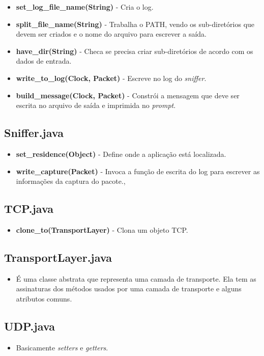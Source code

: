 \documentclass[11pt]{article}
\begin{document}
\begin{itemize}
	\item \textbf{set_log_file_name(String)} - Cria o log.
	\item \textbf{split_file_name(String)} - Trabalha o PATH, vendo os sub-diretórios que devem ser criados e o nome do arquivo para escrever a saída.
	\item \textbf{have_dir(String)} - Checa se precisa criar sub-diretórios de acordo com os dados de entrada.
	\item \textbf{write_to_log(Clock, Packet)} - Escreve no log do \textit{sniffer}.
	\item \textbf{build_message(Clock, Packet)} - Constrói a mensagem que deve ser escrita no arquivo de saída e imprimida no \textit{prompt}.
\end{itemize}

\subsection{Sniffer.java}

\begin{itemize}
	\item \textbf{set_residence(Object)} - Define onde a aplicação está localizada.
	\item \textbf{write_capture(Packet)} - Invoca a função de escrita do log para escrever as informações da captura do pacote.,
\end{itemize}

\subsection{TCP.java}

\begin{itemize}
	\item \textbf{clone_to(TransportLayer)} - Clona um objeto TCP.
\end{itemize}

\subsection{TransportLayer.java}

\begin{itemize}
	\item É uma classe abstrata que representa uma camada de transporte. Ela tem as assinaturas dos métodos usados por uma camada de transporte e alguns atributos comuns.
\end{itemize}

\subsection{UDP.java}

\begin{itemize}
	\item Basicamente \textit{setters} e \textit{getters}.
\end{itemize}
\end{document}
